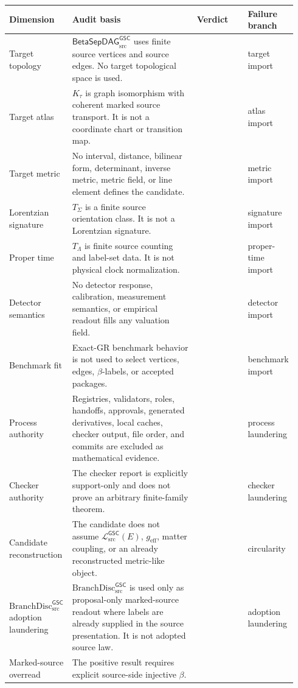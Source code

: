 \documentclass[11pt]{article}
\newcommand{\MetricData}{\mathcal{L}_{\mathrm{src}}^{\mathsf{GSC}}}
\newcommand{\geff}{g_{\mathrm{eff}}}
\newcommand{\BranchDisc}{\mathrm{BranchDisc}_{\mathrm{src}}^{\mathsf{GSC}}}
\newcommand{\BetaGraph}{\mathsf{BetaSepDAG}_{\mathrm{src}}^{\mathsf{GSC}}}
\newcommand{\Pass}{\mathrm{pass\_no\_smuggling\_detected}}
\begin{document}
\begin{longtable}{p{0.19\linewidth}p{0.45\linewidth}p{0.18\linewidth}p{0.12\linewidth}}
\toprule
Dimension & Audit basis & Verdict & Failure branch \\
\midrule
Target topology &
\(\BetaGraph\) uses finite source vertices and source edges. No target
topological space is used. &
\Pass & target import \\
Target atlas &
\(K_\tau\) is graph isomorphism with coherent marked source transport. It is
not a coordinate chart or transition map. &
\Pass & atlas import \\
Target metric &
No interval, distance, bilinear form, determinant, inverse metric, metric
field, or line element defines the candidate. &
\Pass & metric import \\
Lorentzian signature &
\(T_\Sigma\) is a finite source orientation class. It is not a Lorentzian
signature. &
\Pass & signature import \\
Proper time &
\(T_\Lambda\) is finite source counting and label-set data. It is not physical
clock normalization. &
\Pass & proper-time import \\
Detector semantics &
No detector response, calibration, measurement semantics, or empirical
readout fills any valuation field. &
\Pass & detector import \\
Benchmark fit &
Exact-GR benchmark behavior is not used to select vertices, edges,
\(\beta\)-labels, or accepted packages. &
\Pass & benchmark import \\
Process authority &
Registries, validators, roles, handoffs, approvals, generated derivatives,
local caches, checker output, file order, and commits are excluded as
mathematical evidence. &
\Pass & process laundering \\
Checker authority &
The checker report is explicitly support-only and does not prove an arbitrary
finite-family theorem. &
\Pass & checker laundering \\
Candidate reconstruction &
The candidate does not assume \(\MetricData(E)\), \(\geff\), matter coupling,
or an already reconstructed metric-like object. &
\Pass & circularity \\
\(\BranchDisc\) adoption laundering &
\(\BranchDisc\) is used only as proposal-only marked-source readout where
labels are already supplied in the source presentation. It is not adopted
source law. &
\Pass & adoption laundering \\
Marked-source overread &
The positive result requires explicit source-side injective \(\beta\).

\end{longtable}
\end{document}
